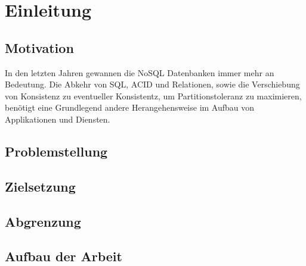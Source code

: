 \chapter{Einleitung}

\section{Motivation}

In den letzten Jahren gewannen die NoSQL Datenbanken immer mehr an Bedeutung.
Die Abkehr von SQL, ACID und Relationen, sowie die Verschiebung von Konsistenz zu eventueller Konsistentz, um Partitionstoleranz zu maximieren,
benötigt eine Grundlegend andere Herangehensweise im Aufbau von Applikationen und Diensten.



\section{Problemstellung}


\section{Zielsetzung}

\section{Abgrenzung}
\section{Aufbau der Arbeit}
